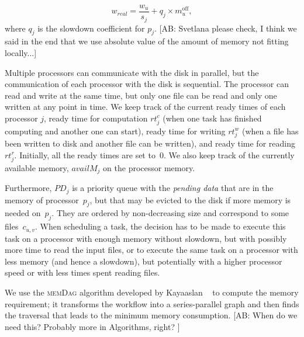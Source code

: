\documentclass[conference]{IEEEtran}
\newcommand{\algo}[1]{\textsc{#1}}
\newcommand{\rt}{rt}
\newcommand{\PD}{PD}
\newcommand{\Moff}[1]{m^{\text{off}}_{#1}}
\newcommand{\skug}[1]{{\color{blue}[SK: #1]}}
\newcommand{\hmey}[1]{{\color{red}[HM: #1]}}
\newcommand{\AB}[1]{{\color{purple}[AB: #1]}}
\begin{document}
    \[
        w_{real} = \frac{w_u}{s_j} +  q_j \times  \Moff{u}, %
    \]
where $q_j$ is the slowdown coefficient for $p_j$. %
\AB{Svetlana please check, I think we said in the end that we use absolute value 
of the amount of memory not fitting locally...}

Multiple processors can communicate with the disk in parallel, but the communication of each processor  with the disk is sequential.
The processor can read and write at the same time, but only one file can be read and only one written at any point in time.
We keep track of the current ready times of each processor $j$, ready time for computation $\rt_j^c$ (when one task has finished
computing and another one can start),
ready time for writing $\rt_j^w$ (when a file has been written to disk and another file can be written), and ready time for
 reading~$\rt_j^r$.
Initially, all the ready times are set to~$0$.
We also keep track of the currently available memory, $availM_j$ on the processor memory. 

Furthermore, $\PD_j$ is a priority queue with the {\em pending data}
that are in the memory of processor~$p_j$,  but that may be evicted to the disk
if more memory is needed on~$p_j$.
They are ordered by non-decreasing size and correspond to some files~$c_{u,v}$.
When scheduling a task, the decision has to be made to execute this task on a processor with enough memory
without slowdown, but with possibly more time to read the input files, or to execute the same task
on a processor with less memory (and hence a slowdown), but potentially with a higher processor speed 
or with less times spent reading files.


We use the \algo{memDag} algorithm developed by Kayaaslan \etal~\cite{KAYAASLAN20181} to compute
the memory requirement; it transforms the workflow into a series-parallel graph
and then finds the traversal that leads to the minimum memory consumption.
\AB{When do we need this? Probably more in Algorithms, right? }

\end{document}
